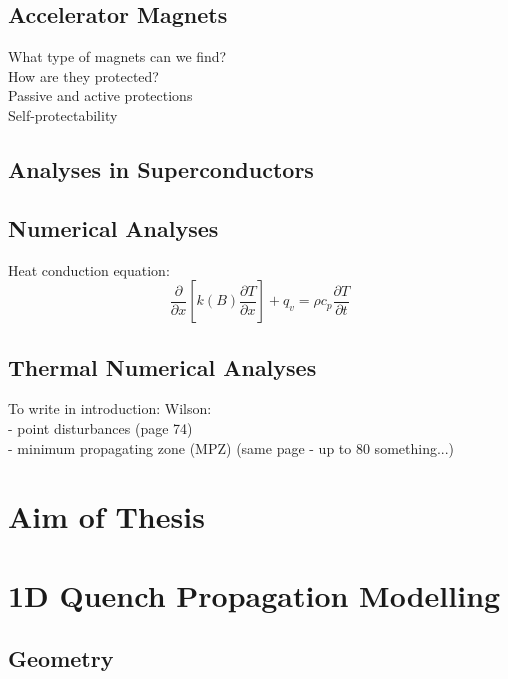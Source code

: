 \documentclass{article}
\begin{document}
\subsection{Accelerator Magnets}
What type of magnets can we find? \\
How are they protected? \\
Passive and active protections \\ 
Self-protectability

\subsection{Analyses in Superconductors}

\subsection{Numerical Analyses}

Heat conduction equation: 
\begin{equation}
    \frac{\partial}{\partial x}[k(B) \frac{\partial T}{\partial x}] + q_v = \rho c_p \frac{\partial T}{\partial t}
\end{equation}



\subsection{Thermal Numerical Analyses}

To write in introduction: 
Wilson: \\
- point disturbances (page 74) \\
- minimum propagating zone (MPZ) (same page - up to 80 something...)

\clearpage
\section{Aim of Thesis}


\clearpage
\section{1D Quench Propagation Modelling}
\label{section: 1d_quench_propagation_modelling}


\subsection{Geometry}
\label{subsection: 1d_quench_propagation_geometry}

\end{document}
